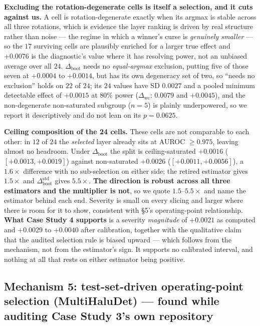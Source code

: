 \documentclass[10pt]{article} %
\begin{document}
\textbf{Excluding the rotation-degenerate cells is itself a selection, and it
cuts against us.} A cell is rotation-degenerate exactly when its argmax is
stable across all three rotations, which is evidence the layer ranking is
driven by real structure rather than noise --- the regime in which a
winner's curse is \emph{genuinely smaller} --- so the $17$ surviving cells
are plausibly enriched for a larger true effect and $+0.0076$ is the
diagnostic's value where it has resolving power, not an unbiased average
over all $24$. $\Delta_{\text{boot}}$ needs no \emph{equal-argmax} exclusion,
putting five of those seven at $+0.0004$ to $+0.0014$, but has its own
degeneracy set of two, so ``needs no exclusion'' holds on $22$ of $24$; its
$24$ values have SD $0.0027$ and a pooled minimum detectable effect of
$+0.0015$ at $80\%$ power ($\Delta_{\text{wc}}$: $0.0079$ and $+0.0045$), and
the non-degenerate non-saturated subgroup ($n=5$) is plainly underpowered, so
we report it descriptively and do not lean on its $p=0.0625$.

\textbf{Ceiling composition of the 24 cells.} These cells are not comparable to
each other: in $12$ of $24$ the \emph{selected} layer already sits at AUROC
$\geq0.975$, leaving almost no headroom. Under $\Delta_{\text{boot}}$ the split
is ceiling-saturated $+0.0016$ ($[+0.0013,+0.0019]$) against non-saturated
$+0.0026$ ($[+0.0011,+0.0056]$), a $1.6\times$ difference with no sub-selection
on either side; the retired estimator gives $1.5\times$ and
$\Delta_{\text{boot}}^{\text{std}}$ gives $5.5\times$. \textbf{The direction is
robust across all three estimators and the multiplier is not}, so we quote
$1.5$--$5.5\times$ and name the estimator behind each end. Severity is small on
every slicing and larger where there is room for it to show, consistent with
§5's operating-point relationship. \textbf{What Case Study 4 supports} is a
severity \emph{magnitude} of $+0.0021$ as computed and $+0.0029$ to $+0.0040$
after calibration, together with the qualitative claim that the audited
selection rule is biased upward --- which follows from the mechanism, not from
the estimator's sign. It supports no calibrated interval, and nothing at all
that rests on either estimator being positive.

\subsection{Mechanism 5: test-set-driven operating-point selection (MultiHaluDet) --- found while auditing Case Study 3's own repository}
\end{document}
